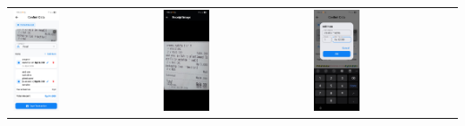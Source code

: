 \begin{tabular}{lll}
    \\
    \includegraphics[width=0.33\textwidth]{images/UI/struk-mapping.jpg} &
    \includegraphics[width=0.33\textwidth]{images/UI/struk-review.jpg} &
    \includegraphics[width=0.33\textwidth]{images/UI/struk-unit.jpg} \\
\end{tabular}

